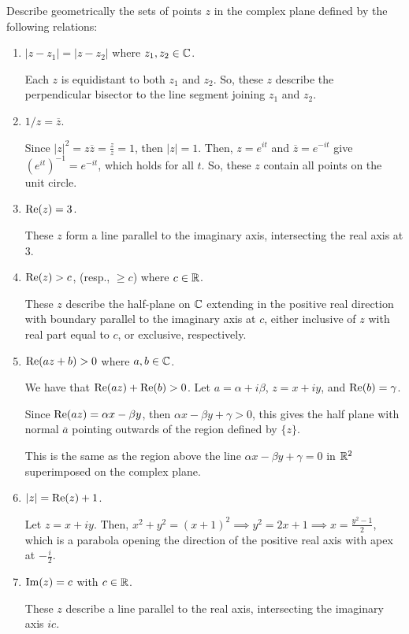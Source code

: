 \documentclass[../hw1]{subfiles}
\begin{document}
\begin{problem}
Describe geometrically the sets of points $z$ in the complex plane defined by the
following relations:
\begin{enumerate}[label=(\alph*)]
	\item $|z-z_1| = |z-z_2|$ where $z_1,z_2\in \mathbb{C}$.

	      Each $z$ is equidistant to both $z_1$ and $z_2$.
	      So, these $z$ describe the perpendicular bisector to the line segment joining $z_1$ and $z_2$.

	\item $1 / z = \overline{z}$.

	      Since $|z|^2=z\overline{z}=\frac{z}{z}=1$, then $|z| = 1$.
	      Then, $z=e^{it}$ and $\overline{z}=e^{-it}$ give ${\left( e^{it} \right)}^{-1}=e^{-it}$, which holds for all $t$.
	      So, these $z$ contain all points on the unit circle.

	\item $\operatorname{Re}(z)=3$.

	      These $z$ form a line parallel to the imaginary axis, intersecting the real axis at 3.

	\item $\operatorname{Re}(z)>c$, (resp., $\ge c$) where $c\in \mathbb{R}$.

	      These $z$ describe the half-plane on $\mathbb{C}$ extending in the positive real direction with boundary parallel to the imaginary axis at $c$, either inclusive of $z$ with real part equal to $c$, or exclusive, respectively.

	\item $\operatorname{Re}(az+b)>0$ where $a,b \in \mathbb{C}$.

	      We have that $\operatorname{Re}(az)+\operatorname{Re}(b)>0$.
	      Let  $a=\alpha+i\beta$, $z=x+iy$, and  $\operatorname{Re}(b)=\gamma$.

	      Since $\operatorname{Re}(az)=\alpha x-\beta y$, then $\alpha x - \beta y + \gamma > 0$,
	      this gives the half plane with normal $\overline{a}$ pointing outwards of the region defined by $\{z\}$.

	      This is the same as the region above the line $\alpha x - \beta y +\gamma = 0$ in  $\mathbb{R}^2$ superimposed on the complex plane.

	\item $|z| =\operatorname{Re}(z)+1$.

	      Let $z=x+iy$.
	      Then, $x^2+y^2=(x+1)^2\implies y^2=2x+1 \implies x=\frac{y^2-1}{2}$,
	      which is a parabola opening the direction of the positive real axis with apex at $-\frac{i}{2}$.

	\item $\operatorname{Im}(z)=c$ with $c \in \mathbb{R}$.

	      These $z$ describe a line parallel to the real axis, intersecting the imaginary axis $ic$.
\end{enumerate}
\end{problem}
\end{document}
